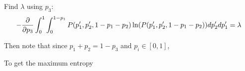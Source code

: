 \begin{enumerate}[label=\textbf{\Alph*}.]
    Find $\lambda$ using $p_3$:
    \begin{align*}
        -\frac{\partial}{\partial p_3}\int_0^1 \int_0^{1-p_1} P(p_1', p_2', 1-p_1-p_2) \ln(P(p_1', p_2', 1-p_1-p_2)) dp_2' dp_1' &= \lambda \\
    \end{align*}

    Then note that since $p_1 + p_2 = 1 - p_3$ and $p_i \in [0,1]$,

    To get the maximum entropy


\end{enumerate}

